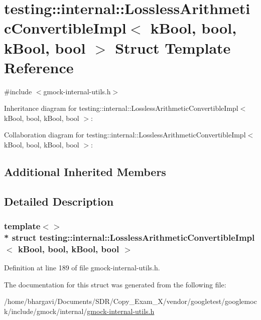 \hypertarget{structtesting_1_1internal_1_1_lossless_arithmetic_convertible_impl_3_01k_bool_00_01bool_00_01k_bool_00_01bool_01_4}{}\section{testing\+:\+:internal\+:\+:Lossless\+Arithmetic\+Convertible\+Impl$<$ k\+Bool, bool, k\+Bool, bool $>$ Struct Template Reference}
\label{structtesting_1_1internal_1_1_lossless_arithmetic_convertible_impl_3_01k_bool_00_01bool_00_01k_bool_00_01bool_01_4}


{\ttfamily \#include $<$gmock-\/internal-\/utils.\+h$>$}



Inheritance diagram for testing\+:\+:internal\+:\+:Lossless\+Arithmetic\+Convertible\+Impl$<$ k\+Bool, bool, k\+Bool, bool $>$\+:


Collaboration diagram for testing\+:\+:internal\+:\+:Lossless\+Arithmetic\+Convertible\+Impl$<$ k\+Bool, bool, k\+Bool, bool $>$\+:
\subsection*{Additional Inherited Members}


\subsection{Detailed Description}
\subsubsection*{template$<$$>$\\*
struct testing\+::internal\+::\+Lossless\+Arithmetic\+Convertible\+Impl$<$ k\+Bool, bool, k\+Bool, bool $>$}



Definition at line 189 of file gmock-\/internal-\/utils.\+h.



The documentation for this struct was generated from the following file\+:\begin{DoxyCompactItemize}
\item 
/home/bhargavi/\+Documents/\+S\+D\+R/\+Copy\+\_\+\+Exam\+\_\+X/vendor/googletest/googlemock/include/gmock/internal/\hyperlink{gmock-internal-utils_8h}{gmock-\/internal-\/utils.\+h}\end{DoxyCompactItemize}
